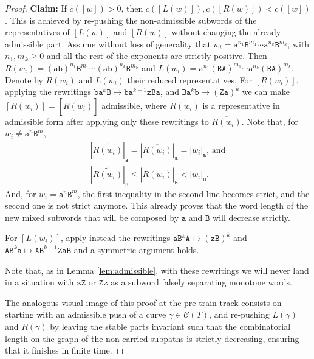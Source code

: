 \documentclass{article}
\begin{document}
\begin{proof}
		\textbf{Claim:} If $c([w])>0$, then $c([L(w)]),c([R(w)])<c([w])$.
		This is achieved by re-pushing the non-admissible subwords of the representatives of $[L(w)]$ and $[R(w)]$  without changing the already-admissible part. Assume without loss of generality that $w_i=\mathtt{a}^{n_1}\mathtt{B}^{m_1}\cdots \mathtt{a}^{n_k}\mathtt{B}^{m_k}$, with $n_1,m_k\geq0$ and all the rest of the exponents are strictly positive. Then $R(w_i)=(\mathtt{ab})^{n_1}\mathtt{B}^{m_1}\cdots (\mathtt{ab})^{n_k}\mathtt{B}^{m_k}$ and $L(w_i)=\mathtt{a}^{n_1}(\mathtt{BA})^{m_1}\cdots \mathtt{a}^{n_k}(\mathtt{BA})^{m_k}$. Denote by $\overline{R(w_i)}$ and $\overline{L(w_i)}$ their reduced representatives. For $[R(w_i)]$, applying the rewritings $\mathtt{ba}^k\mathtt{B}\mapsto\mathtt{ba}^{k-1}\mathtt{zBa}$, and $\mathtt{Ba}^k\mathtt{b}\mapsto(\mathtt{Za})^k$ we can make $[R(w_i)]=[\widetilde{R(w_i)}]$ admissible, where $\widetilde{R(w_i)}$ is a representative in admissible form after applying only these rewritings to $\overline{R(w_i)}$. Note that, for $w_i\neq \mathtt{a}^n\mathtt{B}^m$,
		\begin{align*} |\widetilde{R(w_i)}|_\mathtt{a}=|\overline{R(w_i)}|_\mathtt{a}=|w_i|_\mathtt{a}\text{, and}\\
			|\widetilde{R(w_i)}|_\mathtt{B}\leq|\overline{R(w_i)}|_\mathtt{B}<|w_i|_\mathtt{B}.
		\end{align*}
		And, for $w_i= \mathtt{a}^n\mathtt{B}^m$, the first inequality in the second line becomes strict, and the second one is not strict anymore. This already proves that the word length of the new mixed subwords that will be composed by $\mathtt{a}$ and $\mathtt{B}$ will decrease strictly.
		
		For $[L(w_i)]$, apply instead the rewritings $\mathtt{aB}^k\mathtt{A}\mapsto(\mathtt{zB})^k$ and $\mathtt{AB}^k\mathtt{a}\mapsto\mathtt{AB}^{k-1}\mathtt{ZaB}$ and a symmetric argument holds. 
		
		Note that, as in Lemma \ref{lem:admissible}, with these rewritings we will never land in a situation with $\mathtt{zZ}$ or $\mathtt{Zz}$ as a subword falsely separating monotone words.
		
		The analogous visual image of this proof at the pre-train-track consists on starting with an admissible push of a curve $\gamma\in\mathcal{C}(T)$, and re-pushing $L(\gamma)$ and $R(\gamma)$ by leaving the stable parts invariant such that the combinatorial length on the graph of the non-carried subpaths is strictly decreasing, ensuring that it finishes in finite time.
	\end{proof}	
	
\end{document}
